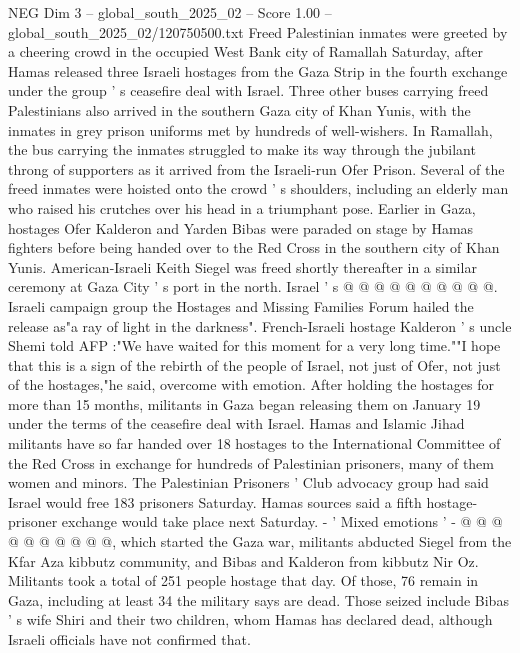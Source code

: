 \begin{textsample}{NEG Dim 3 – global\_south\_2025\_02 – Score 1.00 – global\_south\_2025\_02/120750500.txt}  \label{ex:f3_neg_041}
Freed Palestinian inmates were greeted by a cheering crowd in the occupied West Bank city of Ramallah Saturday, after Hamas released three Israeli hostages from the Gaza Strip in the fourth exchange under the group ' s ceasefire deal with Israel.
Three other buses carrying freed Palestinians also arrived in the southern Gaza city of Khan Yunis, with the inmates in grey prison uniforms met by hundreds of well-wishers.
In Ramallah, the bus carrying the inmates struggled to make its way through the jubilant throng of supporters as it arrived from the Israeli-run Ofer Prison.
Several of the freed inmates were hoisted onto the crowd ' s shoulders, including an elderly man who raised his crutches over his head in a triumphant pose.
Earlier in Gaza, hostages Ofer Kalderon and Yarden Bibas were paraded on stage by Hamas fighters before being handed over to the Red Cross in the southern city of Khan Yunis.
American-Israeli Keith Siegel was freed shortly thereafter in a similar ceremony at Gaza City ' s port in the north.
Israel ' s @ @ @ @ @ @ @ @ @ @.
Israeli campaign group the Hostages and Missing Families Forum hailed the release as"a ray of light in the darkness".
French-Israeli hostage Kalderon ' s uncle Shemi told AFP :"We have waited for this moment for a very long time.""I hope that this is a sign of the rebirth of the people of Israel, not just of Ofer, not just of the hostages,"he said, overcome with emotion.
After holding the hostages for more than 15 months, militants in Gaza began releasing them on January 19 under the terms of the ceasefire deal with Israel.
Hamas and Islamic Jihad militants have so far handed over 18 hostages to the International Committee of the Red Cross in exchange for hundreds of Palestinian prisoners, many of them women and minors.
The Palestinian Prisoners ' Club advocacy group had said Israel would free 183 prisoners Saturday.
Hamas sources said a fifth hostage-prisoner exchange would take place next Saturday. - ' Mixed emotions ' - @ @ @ @ @ @ @ @ @ @, which started the Gaza war, militants abducted Siegel from the Kfar Aza kibbutz community, and Bibas and Kalderon from kibbutz Nir Oz.
Militants took a total of 251 people hostage that day.
Of those, 76 remain in Gaza, including at least 34 the military says are dead.
Those seized include Bibas ' s wife Shiri and their two children, whom Hamas has declared dead, although Israeli officials have not confirmed that.

\end{textsample}
